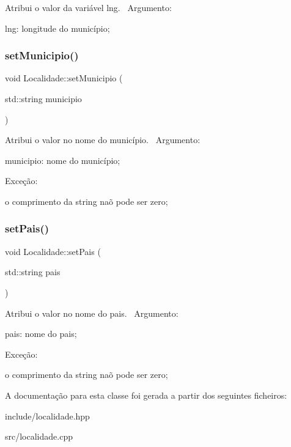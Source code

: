 Atribui o valor da variável lng.~\newline
Argumento\+:
\begin{DoxyItemize}
\item lng\+: longitude do município;
\end{DoxyItemize}\mbox{\label{classLocalidade_a90ac71109a4954863bb045a57e3fc29d}} 
\subsubsection{\texorpdfstring{set\+Municipio()}{setMunicipio()}}
{\footnotesize\ttfamily void Localidade\+::set\+Municipio (\begin{DoxyParamCaption}\item[{std\+::string}]{municipio }\end{DoxyParamCaption})}

Atribui o valor no nome do município.~\newline
 Argumento\+:
\begin{DoxyItemize}
\item municipio\+: nome do município;
\end{DoxyItemize}

Exceção\+:
\begin{DoxyItemize}
\item o comprimento da string naõ pode ser zero;
\end{DoxyItemize}\mbox{\label{classLocalidade_af8e89f3bdcf8dd7bb1f3f74fdc8bc119}} 
\subsubsection{\texorpdfstring{set\+Pais()}{setPais()}}
{\footnotesize\ttfamily void Localidade\+::set\+Pais (\begin{DoxyParamCaption}\item[{std\+::string}]{pais }\end{DoxyParamCaption})}

Atribui o valor no nome do pais.~\newline
 Argumento\+:
\begin{DoxyItemize}
\item pais\+: nome do pais;
\end{DoxyItemize}

Exceção\+:
\begin{DoxyItemize}
\item o comprimento da string naõ pode ser zero;
\end{DoxyItemize}

A documentação para esta classe foi gerada a partir dos seguintes ficheiros\+:\begin{DoxyCompactItemize}
\item 
include/localidade.\+hpp\item 
src/localidade.\+cpp\end{DoxyCompactItemize}
